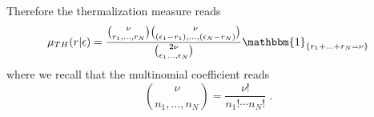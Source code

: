 \documentclass[10pt]{article}
\numberwithin{equation}{section}
\numberwithin{equation}{subsection}
\newcommand{\dt}{\;.}
\begin{document}
Therefore the thermalization measure reads
\begin{equation}
	\begin{split}
	\mu_{TH}(r|\epsilon)=\frac{\binom{\nu}{r_{1},\ldots,r_{N}}\binom{\nu}{(\epsilon_{1}-r_{1}),\ldots,(\epsilon_{N}-r_{N})}}{\binom{2\nu}{\epsilon_{1}\ldots,\epsilon_{N}}}\mathbbm{1}_{\{r_{1}+\ldots+r_{N}=\nu\}}
	\end{split}
\end{equation}
where we recall that the multinomial coefficient reads
\begin{equation}
	\binom{\nu}{n_{1},\ldots,n_{N}}=\frac{\nu!}{n_{1}!\cdots n_{N}!}\dt
\end{equation}
\end{document}
